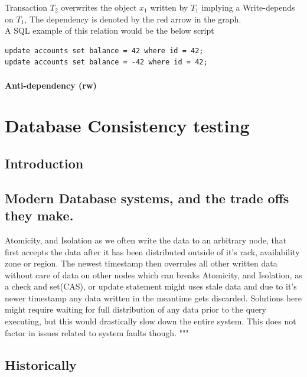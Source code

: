 \documentclass[a4paper,10pt,titlepage]{report}
\begin{document}
Transaction $T_2$ overwrites the object $x_1$ written by $T_1$ implying a Write-depends on $T_1$, The dependency is denoted by the red arrow in the graph. \\

A SQL example of this relation would be the below script

\begin{lstlisting}
update accounts set balance = 42 where id = 42;
update accounts set balance = -42 where id = 42;
\end{lstlisting}

\subsubsection{Anti-dependency (rw)}
        
\newpage

\chapter{Database Consistency testing}

\section{Introduction}


\section{Modern Database systems, and the trade offs they make.}

Atomicity, and Isolation as we often write the data to an arbitrary node, that first accepts the data after it has been distributed outside of it's rack, availability zone or region. The newest timestamp then overrules all other written data without care of data on other nodes which can breaks Atomicity, and Isolation, as a check and set(CAS), or update statement might uses stale data and due to it's newer timestamp any data written in the meantime gets discarded. Solutions here might require waiting for full distribution of any data prior to the query executing, but this would drastically slow down the entire system. This does not factor in issues related to system faults though.
"""


\section{Historically}
\end{document}
